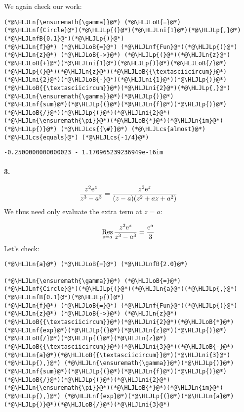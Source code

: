 \documentclass[12pt,a4paper]{article}
\newcommand{\HLJLn}[1]{#1}
\newcommand{\HLJLnf}[1]{\textcolor[RGB]{66,102,213}{#1}}
\newcommand{\HLJLnfB}[1]{\textcolor[RGB]{59,151,46}{#1}}
\newcommand{\HLJLni}[1]{\textcolor[RGB]{59,151,46}{#1}}
\newcommand{\HLJLoB}[1]{\textcolor[RGB]{102,102,102}{\textbf{#1}}}
\newcommand{\HLJLp}[1]{#1}
\newcommand{\HLJLcs}[1]{\textcolor[RGB]{153,153,119}{\textit{#1}}}
\def\E{ {\rm e} }
\def\Res_#1{\underset{#1}{\rm Res}\,}
\begin{document}
We again check our work:


\begin{lstlisting}
(*@\HLJLn{\ensuremath{\gamma}}@*) (*@\HLJLoB{=}@*) (*@\HLJLnf{Circle}@*)(*@\HLJLp{(}@*)(*@\HLJLni{1}@*)(*@\HLJLp{,}@*) (*@\HLJLnfB{0.1}@*)(*@\HLJLp{)}@*)
(*@\HLJLn{f}@*) (*@\HLJLoB{=}@*) (*@\HLJLnf{Fun}@*)(*@\HLJLp{(}@*)(*@\HLJLn{z}@*) (*@\HLJLoB{->}@*) (*@\HLJLp{(}@*)(*@\HLJLn{z}@*)(*@\HLJLoB{+}@*)(*@\HLJLni{1}@*)(*@\HLJLp{)}@*)(*@\HLJLoB{/}@*)(*@\HLJLp{(}@*)(*@\HLJLn{z}@*)(*@\HLJLoB{{\textasciicircum}}@*)(*@\HLJLni{2}@*)(*@\HLJLoB{-}@*)(*@\HLJLni{1}@*)(*@\HLJLp{)}@*)(*@\HLJLoB{{\textasciicircum}}@*)(*@\HLJLni{2}@*)(*@\HLJLp{,}@*) (*@\HLJLn{\ensuremath{\gamma}}@*)(*@\HLJLp{)}@*)
(*@\HLJLnf{sum}@*)(*@\HLJLp{(}@*)(*@\HLJLn{f}@*)(*@\HLJLp{)}@*)(*@\HLJLoB{/}@*)(*@\HLJLp{(}@*)(*@\HLJLni{2}@*)(*@\HLJLn{\ensuremath{\pi}}@*)(*@\HLJLoB{*}@*)(*@\HLJLn{im}@*)(*@\HLJLp{)}@*) (*@\HLJLcs{{\#}}@*) (*@\HLJLcs{almost}@*) (*@\HLJLcs{equals}@*) (*@\HLJLcs{-1/4}@*)
\end{lstlisting}

\begin{lstlisting}
-0.2500000000000023 - 1.170965239236949e-16im
\end{lstlisting}


\paragraph{3.}
\[
{z^2 \E^z \over z^3 - a^3} = {z^2 \E^z \over (z-a) (z^2 + az + a^2)}
\]
We thus need only evaluate the extra term at $z=a$:

\[
\Res_{z = a} {z^2 \E^z \over z^3 - a^3} = {\E^a \over 3}
\]
Let's check:


\begin{lstlisting}
(*@\HLJLn{a}@*) (*@\HLJLoB{=}@*) (*@\HLJLnfB{2.0}@*)

(*@\HLJLn{\ensuremath{\gamma}}@*) (*@\HLJLoB{=}@*) (*@\HLJLnf{Circle}@*)(*@\HLJLp{(}@*)(*@\HLJLn{a}@*)(*@\HLJLp{,}@*) (*@\HLJLnfB{0.1}@*)(*@\HLJLp{)}@*)
(*@\HLJLn{f}@*) (*@\HLJLoB{=}@*) (*@\HLJLnf{Fun}@*)(*@\HLJLp{(}@*)(*@\HLJLn{z}@*) (*@\HLJLoB{->}@*) (*@\HLJLn{z}@*)(*@\HLJLoB{{\textasciicircum}}@*)(*@\HLJLni{2}@*)(*@\HLJLoB{*}@*)(*@\HLJLnf{exp}@*)(*@\HLJLp{(}@*)(*@\HLJLn{z}@*)(*@\HLJLp{)}@*)(*@\HLJLoB{/}@*)(*@\HLJLp{(}@*)(*@\HLJLn{z}@*)(*@\HLJLoB{{\textasciicircum}}@*)(*@\HLJLni{3}@*)(*@\HLJLoB{-}@*)(*@\HLJLn{a}@*)(*@\HLJLoB{{\textasciicircum}}@*)(*@\HLJLni{3}@*)(*@\HLJLp{),}@*) (*@\HLJLn{\ensuremath{\gamma}}@*)(*@\HLJLp{)}@*)
(*@\HLJLnf{sum}@*)(*@\HLJLp{(}@*)(*@\HLJLn{f}@*)(*@\HLJLp{)}@*)(*@\HLJLoB{/}@*)(*@\HLJLp{(}@*)(*@\HLJLni{2}@*)(*@\HLJLn{\ensuremath{\pi}}@*)(*@\HLJLoB{*}@*)(*@\HLJLn{im}@*)(*@\HLJLp{),}@*) (*@\HLJLnf{exp}@*)(*@\HLJLp{(}@*)(*@\HLJLn{a}@*)(*@\HLJLp{)}@*)(*@\HLJLoB{/}@*)(*@\HLJLni{3}@*)
\end{lstlisting}
\end{document}

